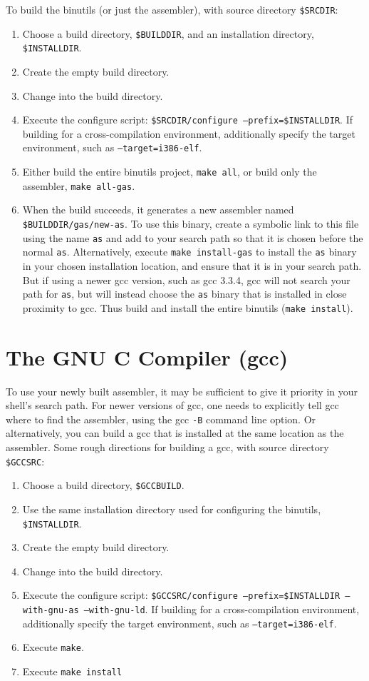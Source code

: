 \documentclass[twoside,a4paper]{report}
\newcommand{\code}[1]{{\tt #1}}
\newcommand{\cmd}[1]{\code{#1}}
\begin{document}
To build the binutils (or just the assembler), with source directory
\code{\$SRCDIR}:
\begin{enumerate}
\item Choose a build directory, \code{\$BUILDDIR}, and an installation
directory, \code{\$INSTALLDIR}.
\item Create the empty build directory.
\item Change into the build directory.
\item Execute the configure script: \cmd{\$SRCDIR/configure
--prefix=\$INSTALLDIR}.  If building for a cross-compilation
environment, additionally specify the target environment, such as
\code{--target=i386-elf}.
\item Either build the entire binutils project, \cmd{make all},
or build only the assembler, \cmd{make all-gas}.
\item When the build succeeds, it generates a new assembler named
\code{\$BUILDDIR/gas/new-as}.  To use this binary, create a symbolic
link to this file using the name \code{as} and add to your search path
so that it is chosen before the normal \code{as}.  Alternatively,
execute \cmd{make install-gas} to install the \code{as} binary in
your chosen installation location, and ensure that it is in your
search path.  But if using a newer gcc version, such as gcc 3.3.4, gcc
will not search your path for \code{as}, but will instead choose the
\code{as} binary that is installed in close proximity to gcc.  Thus
build and install the entire binutils (\cmd{make install}).
\end{enumerate}

\section{The GNU C Compiler (gcc)}

To use your newly built assembler, it may be sufficient to give
it priority in your shell's search path.  For newer versions of gcc,
one needs to explicitly tell gcc where to find the assembler, using
the gcc \code{-B} command line option.  Or alternatively, you can
build a gcc that is installed at the same location as the assembler.
Some rough directions for building a gcc, with source directory
\code{\$GCCSRC}:
\begin{enumerate}
\item Choose a build directory, \code{\$GCCBUILD}.
\item Use the same installation directory used for configuring the
binutils, \code{\$INSTALLDIR}.
\item Create the empty build directory.
\item Change into the build directory.
\item Execute the configure script: \cmd{\$GCCSRC/configure
--prefix=\$INSTALLDIR --with-gnu-as --with-gnu-ld}.  If building for a
cross-compilation environment, additionally specify the target
environment, such as \code{--target=i386-elf}.
\item Execute \cmd{make}.
\item Execute \cmd{make install}
\end{enumerate}
\end{document}
